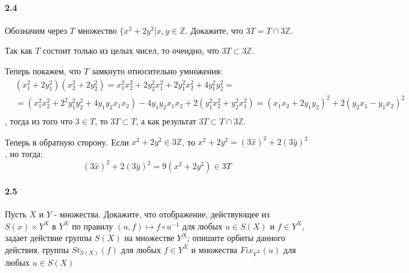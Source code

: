 \documentclass[a4paper,12pt]{article}
\begin{document}
\paragraph{2.4} Обозначим через $T$ множество $\lbrace x^2 + 2 y^2 | x,y \in \mathbb{Z}$. Докажите, что $3T = T \cap 3\mathbb{Z}$.

\begin{Solution}
Так как $T$ состоит только из целых чисел, то очеидно, что $3T \subset 3\mathbb{Z}$.

Теперь покажем, что $T$ замкнуто относительно умножения:
\[
	\begin{split}
		&\left(x^2_1 + 2y^2_1\right)\left(x^2_2 + 2y^2_2\right) = x_1^2x_2^2 + 2y_2^2x_1^2 + 2y_1^2x_2^2 + 4 y_1^2y_2^2 = \\
		& = \left(x_1^2x_2^2 + 2^2y_1^2y_2^2 + 4y_1y_2x_1x_2\right) - 4y_1y_2x_1x_2 + 2 \left(y_1^2x_2^2 + y_2^2x_1^2\right) = \left(x_1x_2 + 2y_1y_2\right)^2 + 2\left(y_2x_1 - y_1x_2\right)^2 \\
	\end{split}
\]
, тогда из того что $3 \in T$, то $3 T \subset T$, а как результат $3T \subset T \cap 3\mathbb{Z}$.

Теперь в обратную сторону. Если $x^2 + 2y^2 \in 3\mathbb{Z}$, то $x^2 + 2y^2 = \left(3\hat x\right)^2 + 2\left(3\hat y\right)^2$, но тогда:
\[
	\left(3\hat x\right)^2 + 2\left(3\hat y\right)^2 = 9\left(x^2 + 2 y^2\right) \in 3 T
\]
\end{Solution}

\paragraph{2.5} Пусть $X$ и $Y$ - множества. Докажите, что отображение, действующее из $S\left(x\right)\times Y^X$ в $Y^X$ по правилу $\left(u, f\right) \mapsto f \circ u^{-1}$ для любых $u \in S\left(X\right)$ и $f \in Y^X$, задает действие группы $S\left(X\right)$ на множестве $Y^X$; опишите орбиты данного действия, группы $St_{S\left(X\right)}\left(f\right)$ для любых $f \in Y^X$ и множества $Fix_{Y^X}\left(u\right)$ для любых $u \in S\left(X\right)$
\end{document}
